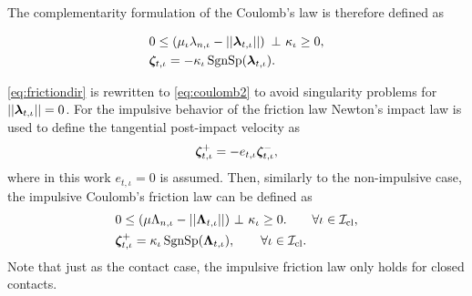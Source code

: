 \documentclass[../DC2017114Bouma.tex]{subfiles}
\begin{document}
The complementarity formulation of the Coulomb's law is therefore defined as

\begin{align}
&0\leq \left(\mu_{\iota}\lambda_{n,\iota} - ||\boldsymbol{\lambda}_{t,\iota}||\right)\ \bot\ \kappa_{\iota} \geq 0,\label{eq:coulomb1}\\
&\boldsymbol{\zeta}_{t,\iota} = -\kappa_{\iota}\operatorname{\text{SgnSp}}(\boldsymbol{\lambda}_{t,\iota}).\label{eq:coulomb2}
\end{align}

\eqref{eq:frictiondir} is rewritten to \eqref{eq:coulomb2} to avoid singularity problems for $||\boldsymbol{\lambda}_{t,\iota}|| = 0$. For the impulsive behavior of the friction law Newton's impact law is used to define the tangential post-impact velocity as
\begin{align}
\boldsymbol{\zeta}^+_{t,\iota} = -e_{t,\iota}\boldsymbol{\zeta}^-_{t,\iota},
\end{align}
where in this work $e_{t,\iota}=0$ is assumed. Then, similarly to the non-impulsive case, the impulsive Coulomb's friction law can be defined as
\begin{align}
&0 \leq (\mu\Lambda_{n,\iota} - ||\Lambdab_{t,\iota}||)\ \bot\ \kappa_{\iota} \geq 0. \qquad \forall \iota\in\Ic_{\text{cl}},\label{eq:coulombimp1}\\
&\zetab_{t,\iota}^+ = \kappa_{\iota}\SgnSp(\Lambdab_{t,\iota}),\qquad \forall \iota\in\Ic_{\text{cl}}.\label{eq:coulombimp2}
\end{align}
Note that just as the contact case, the impulsive friction law only holds for closed contacts.
\end{document}
